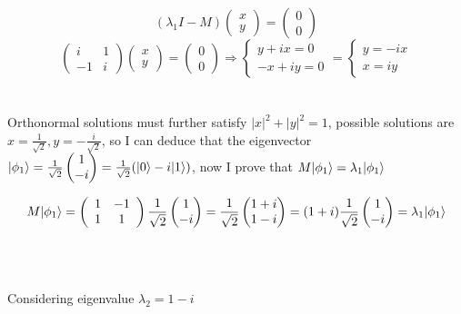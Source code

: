 \documentclass{article}
\DeclarePairedDelimiter\ket{\lvert}{\rangle}
\begin{document}
\[\left(\lambda_1 I - M \right)\begin{pmatrix} x \\ y \end{pmatrix} = \begin{pmatrix} 0 \\ 0 \end{pmatrix} \]
\[
\left( 
    \begin{array}{cc} 
       i & 1 \\
       -1 & i
    \end{array} 
\right)\begin{pmatrix} x \\ y \end{pmatrix} = \begin{pmatrix} 0 \\ 0 \end{pmatrix} \Rightarrow 
\begin{cases} 
y + ix =0 \\ 
-x + iy = 0
\end{cases} =
\begin{cases} 
y = -ix \\ 
x = iy 
\end{cases} 
\]
\\
\\
Orthonormal solutions must further satisfy \(|x|^2 + |y|^2 = 1\), possible solutions are \(x = \frac{1}{\sqrt{2}}, y = -\frac{i}{\sqrt{2}}\), so I can deduce that the eigenvector \(\ket{\phi_1} = \frac{1}{\sqrt{2}}\begin{pmatrix} 1 \\ -i \end{pmatrix} = \frac{1}{\sqrt{2}}(\ket{0} - i \ket{1}) \), now I prove that
\(M \ket{\phi_1} = \lambda_1 \ket{\phi_1}\)

\[ M \ket{\phi_1} =  \left( 
    \begin{array}{cc} 
        1 & -1 \\
        1 & 1
    \end{array} 
\right)\frac{1}{\sqrt{2}}\begin{pmatrix} 1 \\ -i \end{pmatrix} = 
\frac{1}{\sqrt{2}}\begin{pmatrix} 1 + i \\  1 - i \end{pmatrix} = 
(1 + i) \frac{1}{\sqrt{2}}\begin{pmatrix} 1 \\  - i \end{pmatrix} =
\lambda_1 \ket{\phi_1}
\]
\\
\\
\\
Considering eigenvalue \(\lambda_2 = 1 - i\)
\end{document}
